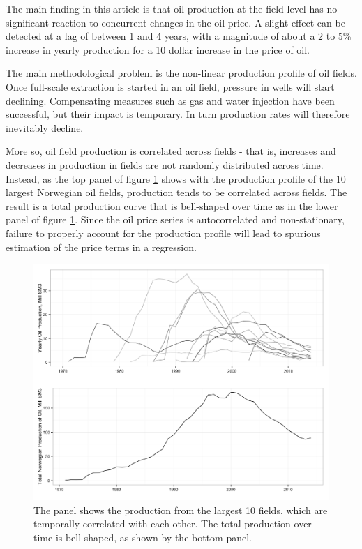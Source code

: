 \documentclass[11pt]{article}
\begin{document}
The main finding in this article is that oil production at the field level has no significant reaction to concurrent changes in the oil price.  A slight effect can be detected at a lag of between 1 and 4 years, with a magnitude of about a 2 to 5\% increase in yearly production for a 10 dollar increase in the price of oil.  


The main methodological problem is the non-linear production profile of oil fields.  Once full-scale extraction is started in an oil field, pressure in wells will start declining. Compensating measures such as gas and water injection have been successful, but their impact is temporary. In turn production rates will therefore inevitably decline.

More so, oil field production is correlated across fields - that is, increases and decreases in production in fields are not randomly distributed across time.  Instead, as the top panel of figure \ref{oil_decline} shows with the production profile of the 10 largest Norwegian oil fields, production tends to be correlated across fields.  The result is a total production curve that is bell-shaped over time as in the lower panel of figure \ref{oil_decline}.  Since the oil price series is autocorrelated and non-stationary, failure to properly account for the production profile will lead to spurious estimation of the price terms in a regression.

\begin{figure}
	\includegraphics[width=1\textwidth]{figures/oil_decline.png}
	\caption{The panel shows the production from the largest 10 fields, which are temporally correlated with each other.  The total production over time is bell-shaped, as shown by the bottom panel.}
	\label{oil_decline}
\end{figure}
\end{document}
